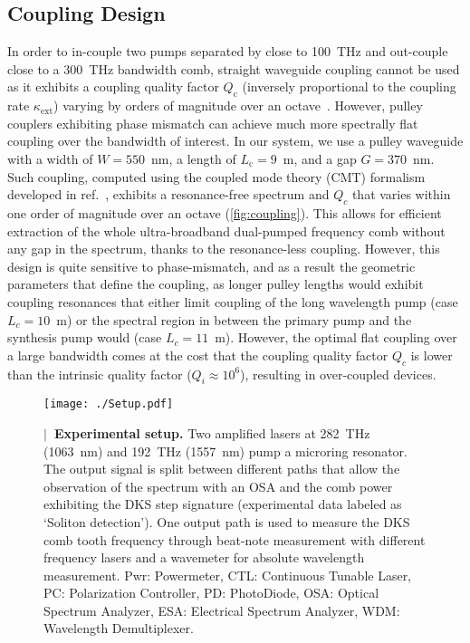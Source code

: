 \documentclass[reprint,superscriptaddress, amsmath,amssymb,pra, aps,floatfix,longbibliography]{revtex4-1}
\begin{document}
\subsection{Coupling Design}
\label{sub:sup-coupling}
In order to in-couple two pumps separated by close to 100~THz and out-couple close to a 300~THz bandwidth comb, straight waveguide coupling cannot be used as it exhibits a coupling quality factor $Q_\mathrm{c}$ (inversely proportional to the coupling rate $\kappa_\mathrm{ext}$) varying by orders of magnitude over an octave~\cite{moille_broadband_2019}. However, pulley couplers exhibiting phase mismatch can achieve much more spectrally flat coupling over the bandwidth of interest. In our system, we use a pulley waveguide with a width of $W=550$~nm, a length of $L_\mathrm{c}=9$~{\textmu}m, and a gap $G=370$~nm. Such coupling, computed using the coupled mode theory (CMT) formalism developed in ref.~\cite{moille_broadband_2019}, exhibits a resonance-free spectrum and $Q_c$ that varies within one order of magnitude over an octave (\cref{fig:coupling}). This allows for efficient extraction of the whole ultra-broadband dual-pumped frequency comb without any gap in the spectrum, thanks to the resonance-less coupling. However, this design is quite sensitive to phase-mismatch, and as a result the geometric parameters that define the coupling, as longer pulley lengths would exhibit coupling resonances that either limit coupling of the long wavelength pump (case $L_c=10$~{\textmu}m) or the spectral region in between the primary pump and the synthesis pump would (case $L_c=11$~{\textmu}m). However, the optimal flat coupling over a large bandwidth comes at the cost that the coupling quality factor $Q_c$ is lower than the intrinsic quality factor ($Q_i \approx 10^6$), resulting in over-coupled devices.

\begin{figure}[!t]
 \begin{center}
  \texttt{[image: ./Setup.pdf]}
 \end{center}
 \caption{\label{fig:setup}\textbf{$|$~Experimental setup.} Two amplified lasers at 282~THz (1063~nm) and 192~THz (1557~nm) pump a microring resonator. The output signal is split between different paths that allow the observation of the spectrum with an OSA and the comb power exhibiting the DKS step signature (experimental data labeled as `Soliton detection’). One output path is used to measure the DKS comb tooth frequency through beat-note measurement with different frequency lasers and a wavemeter for absolute wavelength measurement. Pwr: Powermeter, CTL: Continuous Tunable Laser, PC: Polarization Controller, PD: PhotoDiode, OSA: Optical Spectrum Analyzer, ESA: Electrical Spectrum Analyzer, WDM: Wavelength Demultiplexer.}
\end{figure}
\end{document}
